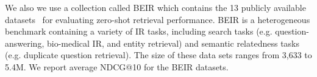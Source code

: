 
We also we use a collection called BEIR which contains the 13 publicly available datasets~\cite{thakur2021beir} 
for evaluating zero-shot retrieval performance. 
BEIR is a heterogeneous benchmark containing a variety of IR tasks, 
including search tasks (e.g.  question-answering, bio-medical IR, and entity retrieval)  
and semantic relatedness tasks (e.g.  duplicate question retrieval). 
The size of these data sets ranges from 3,633 to 5.4M.
We report average NDCG@10 for the BEIR datasets. 

